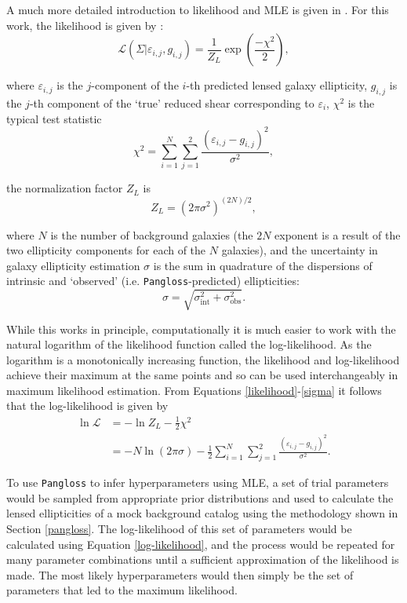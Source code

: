 \documentclass[%
 reprint,
 amsmath,amssymb,
 aps,nofootinbib
]{revtex4-1}
\begin{document}
A much more detailed introduction to likelihood and MLE is given in \cite{bayes_in_sky}. For this work, the likelihood is given by \cite{marshall_thesis}:
\begin{equation}\label{likelihood}
\mathcal{L}(\Sigma|\varepsilon_{i,j},g_{i,j})=\frac{1}{Z_L}\exp\left(\frac{-\chi^2}{2}\right),
\end{equation}

\noindent where $\varepsilon_{i,j}$ is the $j$-component of the $i$-th predicted lensed galaxy ellipticity, $g_{i,j}$ is the $j$-th component of the `true' reduced shear corresponding to $\varepsilon_i$, $\chi^2$ is the typical test statistic
\begin{equation}\label{chi2}
\chi^2=\sum_{i=1}^N\sum_{j=1}^2\frac{(\varepsilon_{i,j}-g_{i,j})^2}{\sigma^2},
\end{equation}

\noindent the normalization factor $Z_L$ is
\begin{equation}
Z_L=(2\pi\sigma^2)^{(2N)/2},
\end{equation}

\noindent where $N$ is the number of background galaxies (the $2N$ exponent is a result of the two ellipticity components for each of the $N$ galaxies), and the uncertainty in galaxy ellipticity estimation $\sigma$ is the sum in quadrature of the dispersions of intrinsic and `observed' (i.e. \texttt{Pangloss}-predicted) ellipticities:
\begin{equation}\label{sigma}
\sigma=\sqrt{\sigma_{\text{int}}^2+\sigma_{\text{obs}}^2}.
\end{equation}

While this works in principle, computationally it is much easier to work with the natural logarithm of the likelihood function called the log-likelihood. As the logarithm is a monotonically increasing function, the likelihood and log-likelihood achieve their maximum at the same points and so can be used interchangeably in maximum likelihood estimation. From Equations \eqref{likelihood}-\eqref{sigma} it follows that the log-likelihood is given by
\begin{align}\label{log-likelihood}
\ln\mathcal{L}&=-\ln Z_L-\frac{1}{2}\chi^2\nonumber \\
&=-N\ln(2\pi\sigma)-\frac{1}{2}\sum_{i=1}^N\sum_{j=1}^2\frac{(\varepsilon_{i,j}-g_{i,j})^2}{\sigma^2}.
\end{align}

To use \texttt{Pangloss} to infer hyperparameters using MLE, a set of trial parameters would be sampled from appropriate prior distributions and used to calculate the lensed ellipticities of a mock background catalog using the methodology shown in Section \ref{pangloss}. The log-likelihood of this set of parameters would be calculated using Equation \eqref{log-likelihood}, and the process would be repeated for many parameter combinations until a sufficient approximation of the likelihood is made. The most likely hyperparameters would then simply be the set of parameters that led to the maximum likelihood.
\end{document}
